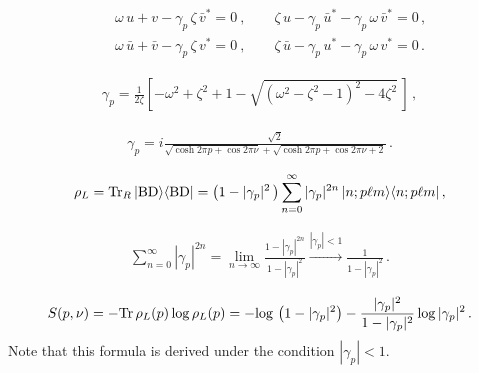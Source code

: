 \begin{eqnarray}
&&\omega\,u + v -\gamma_p\,\zeta\,\bar{v}^* =0 \ , \qquad
\zeta\,u - \gamma_p\,\bar{u}^* - \gamma_p\,\omega\,\bar{v}^* =0\,,
\label{system1}\\
&&\omega\,\bar{u} + \bar{v} -\gamma_p\,\zeta\,v^* =0 \ , \qquad
\zeta\,\bar{u} - \gamma_p\,u^* - \gamma_p\,\omega\,v^* =0\,.
\label{system2}
\end{eqnarray}


\begin{eqnarray}
\gamma_p=\frac{1}{2\zeta}\left[-\omega^2+\zeta^2+1-\sqrt{\left(\omega^2-\zeta^2-1\right)^2-4\zeta^2}\,\right]\,,
\label{gammap}
\end{eqnarray}


\begin{eqnarray}
\gamma_p = i\frac{\sqrt{2}}{\sqrt{\cosh 2\pi p + \cos 2\pi \nu}
 + \sqrt{\cosh 2\pi p + \cos 2\pi \nu +2 }}\,.
\label{gammap2}
\end{eqnarray}


\begin{eqnarray}
\rho_L ={\rm Tr}_{R}\,|{\rm BD}\rangle\langle{\rm BD}|
=\left(1-|\gamma_p|^2\,\right)\sum_{n=0}^\infty |\gamma_p |^{2n}\,|n;p\ell m\rangle\langle n;p\ell m|\,,
\label{densitymatrix1}
\end{eqnarray}

\begin{eqnarray}
\sum_{n=0}^\infty |\gamma_p |^{2n}=\lim_{n\rightarrow\infty}\frac{1-|\gamma_p|^{2n}}{1-|\gamma_p|^2}\xrightarrow{|\gamma_p|<1}\frac{1}{1-|\gamma_p|^2}\,.
\end{eqnarray}


\begin{eqnarray}
S(p,\nu)=-{\rm Tr}\,\rho_L(p)\,{\rm log}\,\rho_L(p)
=-{\rm log}\,\left(1-|\gamma_p|^2\right)
-\frac{|\gamma_p|^2}{1-|\gamma_p|^2}\,{\rm log}\,|\gamma_p|^2\,.
\label{s}
\end{eqnarray}
Note that this formula is derived under the condition $|\gamma_p|<1$.
